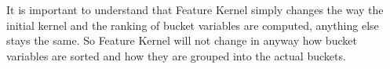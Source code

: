 It is important to understand that Feature Kernel simply changes the way the initial kernel and the ranking of bucket variables are computed, anything else stays the same.
So Feature Kernel 
will not change in anyway how bucket variables are sorted and how they are grouped into the actual buckets. 




